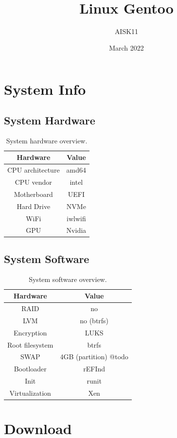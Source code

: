 \documentclass[10pt, a4paper, onecolumn, oneside, titlepage, openany]{book}
\title{\textbf{Linux Gentoo}}
\author{AISK11}
\date{March 2022}
\begin{document}
\maketitle
\tableofcontents


\chapter{System Info}
\section{System Hardware}
\begin{table}[h!]
\centering
\begin{tabular}{|c|c|}
    \hline
    \textbf{Hardware} & \textbf{Value} \\
    \hline
    CPU architecture & amd64\\
    CPU vendor & intel\\
    Motherboard & UEFI\\
    Hard Drive & NVMe\\
    WiFi & iwlwifi\\
    GPU & Nvidia\\
    \hline
\end{tabular}
\caption{System hardware overview.}
\label{table:1}
\end{table}

\section{System Software}
\begin{table}[h!]
\centering
\begin{tabular}{|c|c|}
    \hline
    \textbf{Hardware} & \textbf{Value} \\
    \hline
    RAID & no\\
    LVM & no (btrfs)\\
    Encryption & LUKS\\
    Root filesystem & btrfs\\
    SWAP & 4GB (partition) @todo\\
    Bootloader & rEFInd\\
    Init & runit\\
    Virtualization & Xen\\
    \hline
\end{tabular}
\caption{System software overview.}
\label{table:2}
\end{table}


\chapter{Download}
\end{document}
